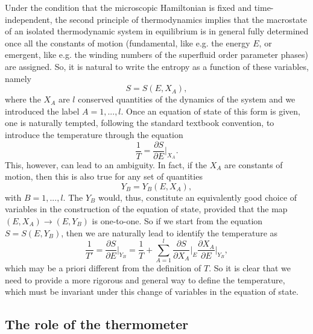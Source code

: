 \documentclass[twocolumn,usenatbib]{mnras2}
\begin{document}
Under the condition that the microscopic Hamiltonian is fixed and time-independent, the second principle of thermodynamics implies that the macrostate of an isolated thermodynamic system in equilibrium is in general fully determined once all the constants of motion (fundamental, like e.g. the energy $E$, or emergent, like e.g. the winding numbers of the superfluid order parameter phases) are assigned. So, it is natural to write the entropy as a function of these variables, namely
\begin{equation}\label{Ilproblema}
S=S(E,X_A),
\end{equation} 
where the $X_A$ are $l$ conserved quantities of the dynamics of the system and we introduced the label $A=1,...,l$. Once an equation of state of this form is given, one is naturally tempted, following the standard textbook convention, to introduce the temperature through the equation
\begin{equation}\label{laprimaT}
\dfrac{1}{T} = \dfrac{\partial S}{\partial E} \bigg|_{X_A}. 
\end{equation} 
This, however, can lead to an ambiguity. In fact, if the $X_A$ are constants of motion, then this is also true for any set of quantities
\begin{equation}
Y_B =Y_B(E,X_A),
\end{equation}
with $B=1,...,l$. The $Y_B$ would, thus, constitute an equivalently good choice of variables in the construction of the equation of state, provided that the map $(E,X_A) \longrightarrow (E,Y_B)$ is one-to-one. So if we start from the equation $S=S(E,Y_B)$, then we are naturally lead to identify the temperature as
\begin{equation}\label{lasecondaT}
\dfrac{1}{T'} = \dfrac{\partial S}{\partial E} \bigg|_{Y_B} = \dfrac{1}{T} + \sum_{A=1}^l \dfrac{\partial S}{\partial X_A} \bigg|_E \dfrac{\partial X_A}{\partial E} \bigg|_{Y_B} ,
\end{equation}
which may be a priori different from the definition of $T$. So it is clear that we need to provide a more rigorous and general way to define the temperature, which must be invariant under this change of variables in the equation of state. 




\subsection{The role of the thermometer}\label{TRTT}
\end{document}
